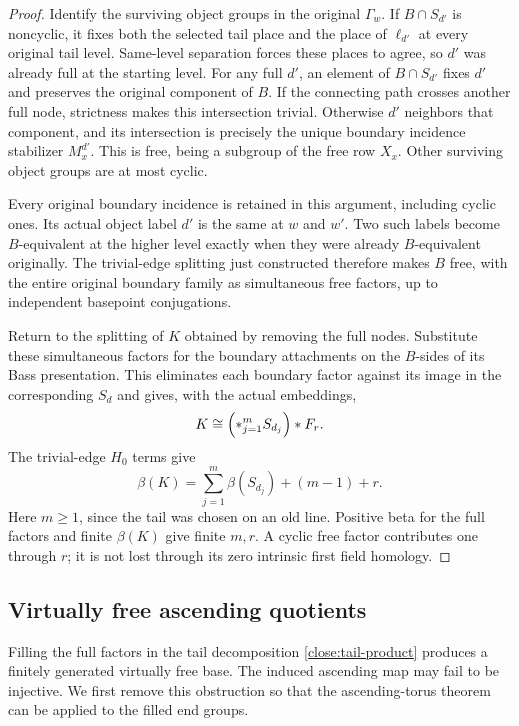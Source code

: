 \begin{proof}
Identify the surviving object groups in the original $\Gamma_w$.
If $B\cap S_{d'}$ is noncyclic, it fixes both the selected tail
place and the place of $\ell_{d'}$ at every original tail level.
Same-level separation forces these places to agree, so $d'$ was
already full at the starting level. For any full $d'$, an element
of $B\cap S_{d'}$ fixes $d'$ and preserves the original component
of $B$. If the connecting path crosses another full node, strictness
makes this intersection trivial. Otherwise $d'$ neighbors that
component, and its intersection is precisely the unique boundary
incidence stabilizer $M_x^{d'}$. This is free, being a subgroup of
the free row $X_x$. Other surviving object groups are at most cyclic.

Every original boundary incidence is retained in this argument,
including cyclic ones. Its actual object label $d'$ is the same at
$w$ and $w'$. Two such labels become $B$-equivalent at the higher
level exactly when they were already $B$-equivalent originally.
The trivial-edge splitting just constructed therefore makes $B$
free, with the entire original boundary family as simultaneous free
factors, up to independent basepoint conjugations.

Return to the splitting of $K$ obtained by removing the full nodes.
Substitute these simultaneous factors for the boundary attachments
on the $B$-sides of its Bass presentation. This eliminates each
boundary factor against its image in the corresponding $S_d$ and
gives, with the actual embeddings,
\[
 K\cong\Bigl(*_{j=1}^m S_{d_j}\Bigr)*F_r.
\]
The trivial-edge $H_0$ terms give
\begin{equation}\label{close:free-product-budget}
 \beta(K)=\sum_{j=1}^m\beta(S_{d_j})+(m-1)+r.
\end{equation}
Here $m\ge1$, since the tail was chosen on an old line. Positive
beta for the full factors and finite $\beta(K)$ give finite $m,r$.
A cyclic free factor contributes one through $r$; it is not lost
through its zero intrinsic first field homology.
\end{proof}

\subsection{Virtually free ascending quotients}

Filling the full factors in the tail decomposition
\eqref{close:tail-product} produces a finitely generated virtually free
base. The induced ascending map may fail to be injective. We first
remove this obstruction so that the ascending-torus theorem can be
applied to the filled end groups.

